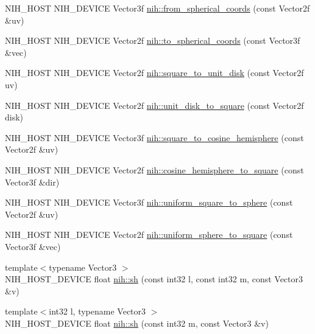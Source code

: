 \begin{DoxyCompactItemize}
\item 
\-N\-I\-H\-\_\-\-H\-O\-S\-T \-N\-I\-H\-\_\-\-D\-E\-V\-I\-C\-E \-Vector3f \hyperlink{group___spherical_gabb50d34723dc8f63f83481dda7e4538a}{nih\-::from\-\_\-spherical\-\_\-coords} (const \-Vector2f \&uv)
\item 
\-N\-I\-H\-\_\-\-H\-O\-S\-T \-N\-I\-H\-\_\-\-D\-E\-V\-I\-C\-E \-Vector2f \hyperlink{group___spherical_gae14d642cb444062ebf966fc27f379972}{nih\-::to\-\_\-spherical\-\_\-coords} (const \-Vector3f \&vec)
\item 
\-N\-I\-H\-\_\-\-H\-O\-S\-T \-N\-I\-H\-\_\-\-D\-E\-V\-I\-C\-E \-Vector2f \hyperlink{group___spherical_ga5852f54031a04a3c2622ac9c1c3ee181}{nih\-::square\-\_\-to\-\_\-unit\-\_\-disk} (const \-Vector2f uv)
\item 
\-N\-I\-H\-\_\-\-H\-O\-S\-T \-N\-I\-H\-\_\-\-D\-E\-V\-I\-C\-E \-Vector2f \hyperlink{group___spherical_ga4c1322b35d3548385cfbcde647eaa9b6}{nih\-::unit\-\_\-disk\-\_\-to\-\_\-square} (const \-Vector2f disk)
\item 
\-N\-I\-H\-\_\-\-H\-O\-S\-T \-N\-I\-H\-\_\-\-D\-E\-V\-I\-C\-E \-Vector3f \hyperlink{group___spherical_ga8b4bb2387e2dcc609267e00777c753d1}{nih\-::square\-\_\-to\-\_\-cosine\-\_\-hemisphere} (const \-Vector2f \&uv)
\item 
\-N\-I\-H\-\_\-\-H\-O\-S\-T \-N\-I\-H\-\_\-\-D\-E\-V\-I\-C\-E \-Vector2f \hyperlink{group___spherical_ga1e65205c0882ccfa8b8cea7ab18525ce}{nih\-::cosine\-\_\-hemisphere\-\_\-to\-\_\-square} (const \-Vector3f \&dir)
\item 
\-N\-I\-H\-\_\-\-H\-O\-S\-T \-N\-I\-H\-\_\-\-D\-E\-V\-I\-C\-E \-Vector3f \hyperlink{group___spherical_ga711e9a117559053c96478f404aa2a278}{nih\-::uniform\-\_\-square\-\_\-to\-\_\-sphere} (const \-Vector2f \&uv)
\item 
\-N\-I\-H\-\_\-\-H\-O\-S\-T \-N\-I\-H\-\_\-\-D\-E\-V\-I\-C\-E \-Vector2f \hyperlink{group___spherical_ga74d80bd5bc66492ae691520586329be5}{nih\-::uniform\-\_\-sphere\-\_\-to\-\_\-square} (const \-Vector3f \&vec)
\item 
{\footnotesize template$<$typename Vector3 $>$ }\\\-N\-I\-H\-\_\-\-H\-O\-S\-T\-\_\-\-D\-E\-V\-I\-C\-E float \hyperlink{group___spherical_ga61b3dccbdbb3265ced8cfefc49c4f96c}{nih\-::sh} (const int32 l, const int32 m, const \-Vector3 \&v)
\item 
{\footnotesize template$<$int32 l, typename Vector3 $>$ }\\\-N\-I\-H\-\_\-\-H\-O\-S\-T\-\_\-\-D\-E\-V\-I\-C\-E float \hyperlink{group___spherical_ga84c13afac74205bed1f5f3a382088394}{nih\-::sh} (const int32 m, const \-Vector3 \&v)

\end{DoxyCompactItemize}
